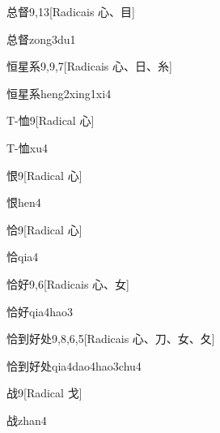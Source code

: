 \begin{entry}{总督}{9,13}[Radicais ⼼、⽬]
  \begin{phonetics}{总督}{zong3du1}
  \end{phonetics}
\end{entry}

\begin{entry}{恒星系}{9,9,7}[Radicais ⼼、⽇、⽷]
  \begin{phonetics}{恒星系}{heng2xing1xi4}
  \end{phonetics}
\end{entry}

\begin{entry}{T-恤}{9}[Radical ⼼]
  \begin{phonetics}{T-恤}{xu4}
  \end{phonetics}
\end{entry}

\begin{entry}{恨}{9}[Radical ⼼]
  \begin{phonetics}{恨}{hen4}
  \end{phonetics}
\end{entry}

\begin{entry}{恰}{9}[Radical ⼼]
  \begin{phonetics}{恰}{qia4}
  \end{phonetics}
\end{entry}

\begin{entry}{恰好}{9,6}[Radicais ⼼、⼥]
  \begin{phonetics}{恰好}{qia4hao3}
  \end{phonetics}
\end{entry}

\begin{entry}{恰到好处}{9,8,6,5}[Radicais ⼼、⼑、⼥、⼡]
  \begin{phonetics}{恰到好处}{qia4dao4hao3chu4}
  \end{phonetics}
\end{entry}

\begin{entry}{战}{9}[Radical ⼽]
  \begin{phonetics}{战}{zhan4}
  \end{phonetics}
\end{entry}

